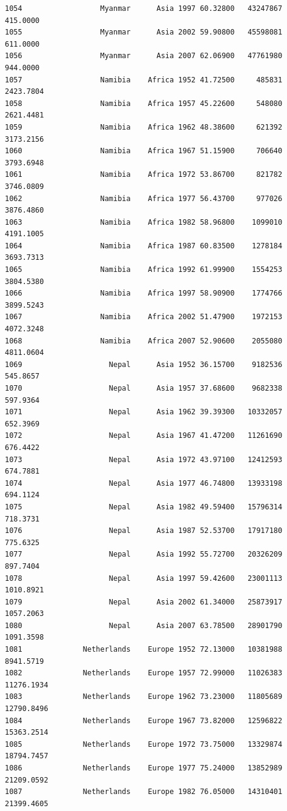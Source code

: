 \documentclass[
  letterpaper,
  DIV=11,
  numbers=noendperiod]{scrreprt}
\begin{document}
\begin{verbatim}
1054                  Myanmar      Asia 1997 60.32800   43247867    415.0000
1055                  Myanmar      Asia 2002 59.90800   45598081    611.0000
1056                  Myanmar      Asia 2007 62.06900   47761980    944.0000
1057                  Namibia    Africa 1952 41.72500     485831   2423.7804
1058                  Namibia    Africa 1957 45.22600     548080   2621.4481
1059                  Namibia    Africa 1962 48.38600     621392   3173.2156
1060                  Namibia    Africa 1967 51.15900     706640   3793.6948
1061                  Namibia    Africa 1972 53.86700     821782   3746.0809
1062                  Namibia    Africa 1977 56.43700     977026   3876.4860
1063                  Namibia    Africa 1982 58.96800    1099010   4191.1005
1064                  Namibia    Africa 1987 60.83500    1278184   3693.7313
1065                  Namibia    Africa 1992 61.99900    1554253   3804.5380
1066                  Namibia    Africa 1997 58.90900    1774766   3899.5243
1067                  Namibia    Africa 2002 51.47900    1972153   4072.3248
1068                  Namibia    Africa 2007 52.90600    2055080   4811.0604
1069                    Nepal      Asia 1952 36.15700    9182536    545.8657
1070                    Nepal      Asia 1957 37.68600    9682338    597.9364
1071                    Nepal      Asia 1962 39.39300   10332057    652.3969
1072                    Nepal      Asia 1967 41.47200   11261690    676.4422
1073                    Nepal      Asia 1972 43.97100   12412593    674.7881
1074                    Nepal      Asia 1977 46.74800   13933198    694.1124
1075                    Nepal      Asia 1982 49.59400   15796314    718.3731
1076                    Nepal      Asia 1987 52.53700   17917180    775.6325
1077                    Nepal      Asia 1992 55.72700   20326209    897.7404
1078                    Nepal      Asia 1997 59.42600   23001113   1010.8921
1079                    Nepal      Asia 2002 61.34000   25873917   1057.2063
1080                    Nepal      Asia 2007 63.78500   28901790   1091.3598
1081              Netherlands    Europe 1952 72.13000   10381988   8941.5719
1082              Netherlands    Europe 1957 72.99000   11026383  11276.1934
1083              Netherlands    Europe 1962 73.23000   11805689  12790.8496
1084              Netherlands    Europe 1967 73.82000   12596822  15363.2514
1085              Netherlands    Europe 1972 73.75000   13329874  18794.7457
1086              Netherlands    Europe 1977 75.24000   13852989  21209.0592
1087              Netherlands    Europe 1982 76.05000   14310401  21399.4605

\end{verbatim}
\end{document}
